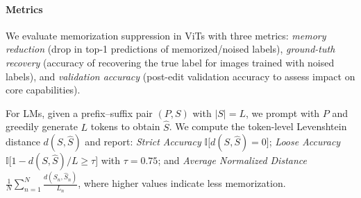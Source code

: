 \documentclass{article} %
\begin{document}
\paragraph{Metrics}
\label{sec:mem_metrics}
We evaluate memorization suppression in ViTs with three metrics: \emph{memory reduction} (drop in top-1 predictions of memorized/noised labels), \emph{ground-tuth recovery} (accuracy of recovering the true label for images trained with noised labels), and \emph{validation accuracy} (post-edit validation accuracy to assess impact on core capabilities).

For LMs, given a prefix--suffix pair \((P,S)\) with \(|S|=L\), we prompt with \(P\) and greedily generate \(L\) tokens to obtain \(\hat{S}\). We compute the token-level Levenshtein distance \(d(S,\hat{S})\) and report: \emph{Strict Accuracy} \(\mathbb{I}\bigl[d(S,\hat{S})=0\bigr]\); \emph{Loose Accuracy} \(\mathbb{I}\bigl[1-d(S,\hat{S})/L\ge\tau\bigr]\) with \(\tau=0.75\); and \emph{Average Normalized Distance} \(\frac{1}{N}\sum_{n=1}^{N} \frac{d(S_n,\hat{S}_n)}{L_n}\), where higher values indicate less memorization.


\end{document}
